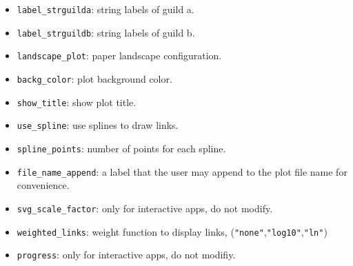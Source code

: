\documentclass[12pt]{article}
\begin{document}
\begin{itemize}
\item \texttt{label\_strguilda}: string labels of guild a.

\item \texttt{label\_strguildb}: string labels of guild b.

\item \texttt{landscape\_plot}: paper landscape configuration.

\item \texttt{backg\_color}: plot background color.

\item \texttt{show\_title}: show plot title.

\item \texttt{use\_spline}: use splines to draw links.

\item \texttt{spline\_points}: number of points for each spline.

\item \texttt{file\_name\_append}: a label that the user may append to the plot file name for convenience.

\item \texttt{svg\_scale\_factor}: only for interactive apps, do not modify.

\item \texttt{weighted\_links}: weight function to display links, (\texttt{"none"},\texttt{"log10"},\texttt{"ln"})

\item \texttt{progress}: only for interactive apps, do not modifiy.
\end{itemize}


\normalsize

\clearpage
\printbibliography[heading=bibintoc]
\end{document}
